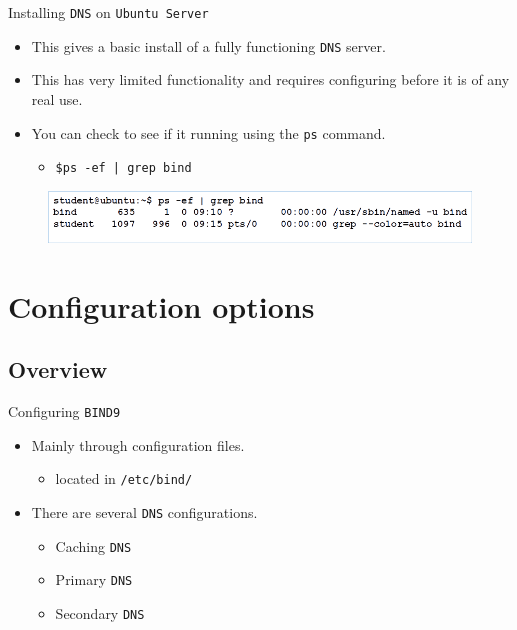 \documentclass{beamer}
\begin{document}
\begin{frame}{Installing \texttt{DNS} on \texttt{Ubuntu Server}}
  \begin{itemize}
    \item This gives a basic install of a fully functioning \texttt{DNS} server.
    \item This has very limited functionality and requires configuring before it is of any real use.
    \item You can check to see if it running using the \texttt{ps} command.
      \begin{itemize}
        \item \texttt{\$ps -ef | grep bind}
      \end{itemize}
    \end{itemize}
  \begin{figure}
    \begin{center}
      \includegraphics[width=0.9\linewidth]{ps-bind.png}
    \end{center}
  \end{figure}
\end{frame}

\section{Configuration options}
\subsection{Overview}

\begin{frame}{Configuring \texttt{BIND9}}
  \begin{itemize}
    \item Mainly through configuration files.
      \begin{itemize}
        \item located in \texttt{/etc/bind/}
      \end{itemize}
    \item There are several \texttt{DNS} configurations.
      \begin{itemize}
        \item Caching \texttt{DNS}
        \item Primary \texttt{DNS}
        \item Secondary \texttt{DNS}
      \end{itemize}
  \end{itemize}
\end{frame}
\end{document}
